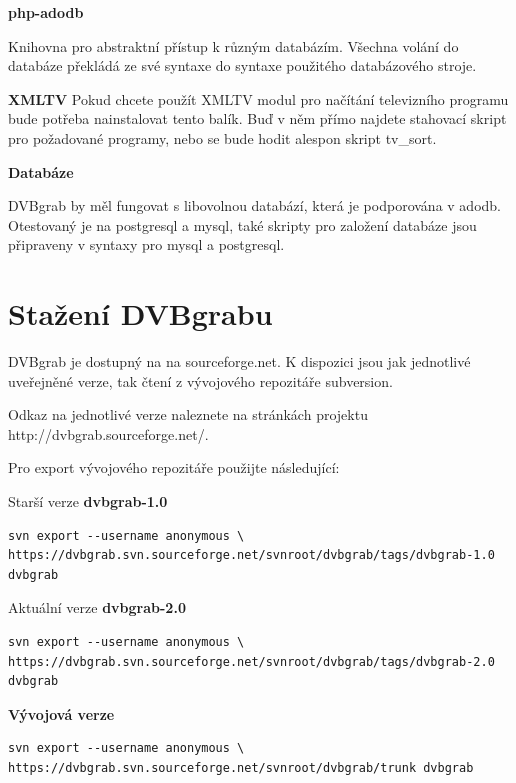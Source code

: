 \vspace{10pt}

\textbf{php-adodb}

Knihovna pro abstraktní přístup k různým databázím. Všechna volání do databáze překládá ze své syntaxe do syntaxe použitého databázového stroje.

\vspace{10pt}

\textbf{XMLTV}
Pokud chcete použít XMLTV modul pro načítání televizního programu bude potřeba nainstalovat tento balík. Buď v něm přímo najdete stahovací skript pro požadované programy, nebo se bude hodit alespon skript tv\_sort.

\vspace{10pt}

\textbf{Databáze}

DVBgrab by měl fungovat s libovolnou databází, která je podporována v adodb. Otestovaný je na postgresql a mysql, také skripty pro založení databáze jsou připraveny v syntaxy pro mysql a postgresql.

\vspace{10pt}

\section{Stažení DVBgrabu}

\vspace{10pt}

DVBgrab je dostupný na na sourceforge.net. K dispozici jsou jak jednotlivé uveřejněné verze, tak čtení z vývojového repozitáře subversion.

Odkaz na jednotlivé verze naleznete na stránkách projektu http://dvbgrab.sourceforge.net/.

Pro export vývojového repozitáře použijte následující:

\vspace{10pt}

Starší verze \textbf{dvbgrab-1.0}
\begin{small}\begin{verbatim}
svn export --username anonymous \
https://dvbgrab.svn.sourceforge.net/svnroot/dvbgrab/tags/dvbgrab-1.0 dvbgrab
\end{verbatim}\end{small}
Aktuální verze \textbf{dvbgrab-2.0}
\begin{small}\begin{verbatim}
svn export --username anonymous \
https://dvbgrab.svn.sourceforge.net/svnroot/dvbgrab/tags/dvbgrab-2.0 dvbgrab
\end{verbatim}\end{small}
\textbf{Vývojová verze}
\begin{small}\begin{verbatim}
svn export --username anonymous \
https://dvbgrab.svn.sourceforge.net/svnroot/dvbgrab/trunk dvbgrab
\end{verbatim}\end{small}

